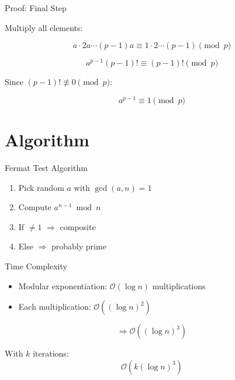 \documentclass{beamer}
\newcommand{\bigO}{\mathcal{O}}
\begin{document}

\begin{frame}{Proof: Final Step}

Multiply all elements:

\[
a \cdot 2a \cdots (p-1)a \equiv 1 \cdot 2 \cdots (p-1) \pmod{p}
\]

\[
a^{p-1}(p-1)! \equiv (p-1)! \pmod{p}
\]

Since $(p-1)! \not\equiv 0 \pmod{p}$:

\[
a^{p-1} \equiv 1 \pmod{p}
\]

\end{frame}

\section{Algorithm}

\begin{frame}{Fermat Test Algorithm}

\begin{enumerate}
    \item Pick random $a$ with $\gcd(a,n)=1$
    \item Compute $a^{n-1} \bmod n$
    \item If $\neq 1$ $\Rightarrow$ composite
    \item Else $\Rightarrow$ probably prime
\end{enumerate}

\end{frame}


\begin{frame}{Time Complexity}

\begin{itemize}
    \item Modular exponentiation: $\bigO(\log n)$ multiplications
    \item Each multiplication: $\bigO((\log n)^2)$
\end{itemize}

\[
\Rightarrow \bigO((\log n)^3)
\]

\vspace{1em}

With $k$ iterations:
\[
\bigO(k (\log n)^3)
\]

\end{frame}

\end{document}
